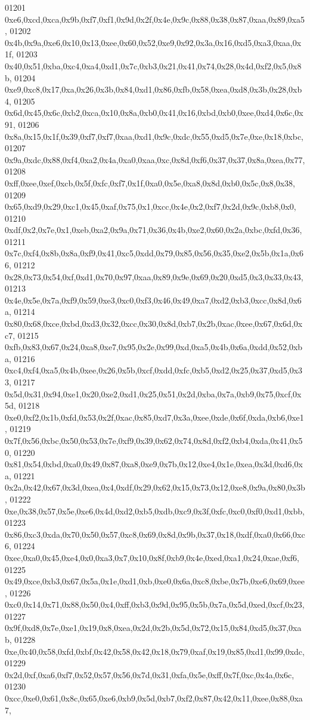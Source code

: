\begin{DoxyCode}
01201   0xe6,0xcd,0xca,0x9b,0xf7,0xf1,0x9d,0x2f,0x4e,0x9c,0x88,0x38,0x87,0xaa,0x89,0xa5,
01202   0x4b,0x9a,0xe6,0x10,0x13,0xee,0x60,0x52,0xe9,0x92,0x3a,0x16,0xd5,0xa3,0xaa,0x1f,
01203   0x40,0x51,0xba,0xc4,0xa4,0xd1,0x7c,0xb3,0x21,0x41,0x74,0x28,0x4d,0xf2,0x5,0x8b,
01204   0xe9,0xc8,0x17,0xa,0x26,0x3b,0x84,0xd1,0x86,0xfb,0x58,0xea,0xd8,0x3b,0x28,0xb4,
01205   0x6d,0x45,0x6c,0xb2,0xca,0x10,0x8a,0xb0,0x41,0x16,0xbd,0xb0,0xee,0xd4,0x6c,0x91,
01206   0x8a,0x15,0x1f,0x39,0xf7,0xf7,0xaa,0xd1,0x9c,0xdc,0x55,0xd5,0x7e,0xe,0x18,0xbc,
01207   0x9a,0xdc,0x88,0xf4,0xa2,0x4a,0xa0,0xaa,0xc,0x8d,0xf6,0x37,0x37,0x8a,0xea,0x77,
01208   0xff,0xee,0xef,0xcb,0x5f,0xfc,0xf7,0x1f,0xa0,0x5e,0xa8,0x8d,0xb0,0x5c,0x8,0x38,
01209   0x65,0xd9,0x29,0xc1,0x45,0xaf,0x75,0x1,0xcc,0x4e,0x2,0xf7,0x2d,0x9c,0xb8,0x0,
01210   0xdf,0x2,0x7e,0x1,0xeb,0xa2,0x9a,0x71,0x36,0x4b,0xe2,0x60,0x2a,0xbc,0xfd,0x36,
01211   0x7c,0xf4,0x8b,0x8a,0xf9,0x41,0xc5,0xdd,0x79,0x85,0x56,0x35,0xe2,0x5b,0x1a,0x66,
01212   0x28,0x73,0x54,0xf,0xd1,0x70,0x97,0xaa,0x89,0x9e,0x69,0x20,0xd5,0x3,0x33,0x43,
01213   0x4e,0x5e,0x7a,0xf9,0x59,0xe3,0xc0,0xf3,0x46,0x49,0xa7,0xd2,0xb3,0xcc,0x8d,0x6a,
01214   0x80,0x68,0xce,0xbd,0xd3,0x32,0xcc,0x30,0x8d,0xb7,0x2b,0xac,0xee,0x67,0x6d,0xc7,
01215   0xfb,0x83,0x67,0x24,0xa8,0xe7,0x95,0x2e,0x99,0xd,0xa5,0x4b,0x6a,0xdd,0x52,0xba,
01216   0xc4,0xf4,0xa5,0x4b,0xee,0x26,0x5b,0xcf,0xdd,0xfc,0xb5,0xd2,0x25,0x37,0xd5,0x33,
01217   0x5d,0x31,0x94,0xe1,0x20,0xe2,0xd1,0x25,0x51,0x2d,0xba,0x7a,0xb9,0x75,0xcf,0x5d,
01218   0xe0,0xf2,0x1b,0xfd,0x53,0x2f,0xac,0x85,0xd7,0x3a,0xee,0xde,0x6f,0xda,0xb6,0xe1,
01219   0x7f,0x56,0xbc,0x50,0x53,0x7e,0xf9,0x39,0x62,0x74,0x8d,0xf2,0xb4,0xda,0x41,0x50,
01220   0x81,0x54,0xbd,0xa0,0x49,0x87,0xa8,0xe9,0x7b,0x12,0xe4,0x1e,0xea,0x3d,0xd6,0xa,
01221   0x2a,0x42,0x67,0x3d,0xea,0x4,0xdf,0x29,0x62,0x15,0x73,0x12,0xe8,0x9a,0x80,0x3b,
01222   0xe,0x38,0x57,0x5e,0xe6,0x4d,0xd2,0xb5,0xdb,0xc9,0x3f,0xfc,0xc0,0xf0,0xd1,0xbb,
01223   0x86,0xc3,0xda,0x70,0x50,0x57,0xc8,0x69,0x8d,0x9b,0x37,0x18,0xdf,0xa0,0x66,0xc6,
01224   0xec,0xa0,0x45,0xe4,0x0,0xa3,0x7,0x10,0x8f,0xb9,0x4e,0xed,0xa1,0x24,0xae,0xf6,
01225   0x49,0xce,0xb3,0x67,0x5a,0x1e,0xd1,0xb,0xe0,0x6a,0xc8,0xbe,0x7b,0xe6,0x69,0xee,
01226   0xc0,0x14,0x71,0x88,0x50,0x4,0xff,0xb3,0x9d,0x95,0x5b,0x7a,0x5d,0xed,0xcf,0x23,
01227   0x9f,0xd8,0x7e,0xe1,0x19,0x8,0xea,0x2d,0x2b,0x5d,0x72,0x15,0x84,0xd5,0x37,0xab,
01228   0xe,0x40,0x58,0xfd,0xbf,0x42,0x58,0x42,0x18,0x79,0xaf,0x19,0x85,0xd1,0x99,0xdc,
01229   0x2d,0xf,0xa6,0xf7,0x52,0x57,0x56,0x7d,0x31,0xfa,0x5e,0xff,0x7f,0xc,0x4a,0x6c,
01230   0xcc,0xe0,0x61,0x8c,0x65,0xe6,0xb9,0x5d,0xb7,0xf2,0x87,0x42,0x11,0xee,0x88,0xa7,

\end{DoxyCode}
